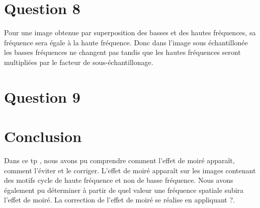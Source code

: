 \documentclass[a4paper,12pt]{report}
\begin{document}
\section*{Question 8}

Pour une image obtenue par superposition des basses et des hautes fréquences, sa fréquence sera égale à la haute fréquence. Donc dans l'image sous échantillonée les basses fréquences ne changent pas tandis que les hautes fréquences seront multipliées par le facteur de sous-échantillonage.


\section*{Question 9}


\newpage

\section*{Conclusion}
Dans ce tp , nous avons pu comprendre comment l'effet de moiré apparaît, comment l'éviter et le corriger. L'effet de moiré apparaît sur les images contenant des motifs cycle de haute fréquence et non de basse fréquence. Nous avons également pu déterminer à partir de quel valeur une fréquence spatiale subira l'effet de moiré. La correction de l'effet de moiré se réalise en appliquant ?. 
\end{document}
